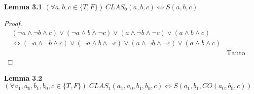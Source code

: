 \documentclass{article}
\begin{document}
\noindent \textbf{Lemma 3.1}  $ (\forall a, b, c \in \{T, F\}) \: CLAS_0(a, b, c) \iff S(a, b, c)  $ 
\begin{proof}
	\begin{align*}
	(\lnot a \land \lnot b \land c) \lor (\lnot a \land b \land \lnot c) \lor 
	(a \land \lnot b \land \lnot c) \lor (a \land b \land c) 
	\\ \iff (\lnot a \land \lnot b \land c) \lor 
	(\lnot a \land b \land \lnot c) \lor 
	(a \land \lnot b \land \lnot c) \lor (a \land b \land c) \\
	& \text{Tauto}
	\end{align*}
\end{proof}

\noindent \textbf{Lemma 3.2}  $ (\forall a_1, a_0, b_1, b_0, c \in \{T, F\}) \; CLAS_1(a_1, a_0, b_1, b_0, c) \iff S(a_1, b_1, CO(a_0, b_0, c))  $ 
\end{document}
